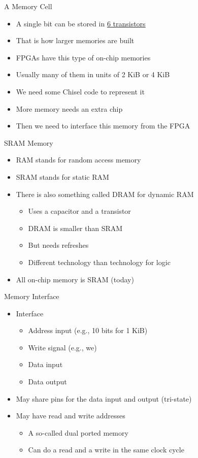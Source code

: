 \begin{frame}[fragile]{A Memory Cell}
\begin{itemize}
\item A single bit can be stored in \href{https://en.wikipedia.org/wiki/Static_random-access_memory#/media/File:SRAM_Cell_(6_Transistors).svg}{6 transistors}
\item That is how larger memories are built
\item FPGAs have this type of on-chip memories
\item Usually many of them in units of 2 KiB or 4 KiB
\item We need some Chisel code to represent it
\item More memory needs an extra chip
\item Then we need to interface this memory from the FPGA
\end{itemize}
\end{frame}

\begin{frame}[fragile]{SRAM Memory}
\begin{itemize}
\item RAM stands for random access memory
\item SRAM stands for static RAM
\item There is also something called DRAM for dynamic RAM
\begin{itemize}
\item Uses a capacitor and a transistor
\item DRAM is smaller than SRAM
\item But needs refreshes
\item Different technology than technology for logic
\end{itemize}
\item All on-chip memory is SRAM (today)
\end{itemize}
\end{frame}

\begin{frame}[fragile]{Memory Interface}
\begin{itemize}
\item Interface
\begin{itemize}
\item Address input (e.g., 10 bits for 1 KiB)
\item Write signal (e.g., we)
\item Data input
\item Data output
\end{itemize}
\item May share pins for the data input and output (tri-state)
\item May have read and write addresses
\begin{itemize}
\item A so-called dual ported memory
\item Can do a read and a write in the same clock cycle
\end{itemize}
\end{itemize}
\end{frame}


